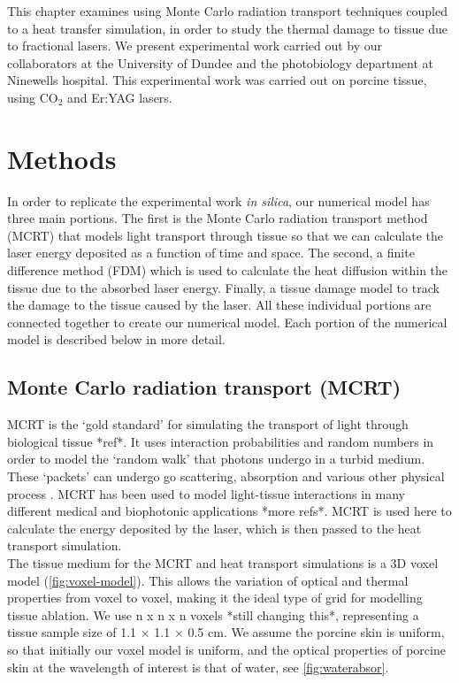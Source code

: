This chapter examines using Monte Carlo radiation transport techniques coupled to a heat transfer simulation, in order to study the thermal damage to tissue due to fractional lasers. We present experimental work carried out by our collaborators at the University of Dundee and the photobiology department at Ninewells hospital. This experimental work was carried out on porcine tissue, using CO$_2$ and Er:YAG lasers.

\section{Methods}

In order to replicate the experimental work \textit{in silica}, our numerical model has three main portions. The first is the Monte Carlo radiation transport method (MCRT) that models light transport through tissue so that we can calculate the laser energy deposited as a function of time and space. The second, a finite difference method (FDM) which is used to calculate the heat diffusion within the tissue due to the absorbed laser energy. Finally, a tissue damage model to track the damage to the tissue caused by the laser. All these individual portions are connected together to create our numerical model. Each portion of the numerical model is described below in more detail.

\subsection{Monte Carlo radiation transport (MCRT)}

MCRT is the `gold standard' for simulating the transport of light through biological tissue *ref*. It uses interaction probabilities and random numbers in order to model the `random walk' that photons undergo in a turbid medium. These `packets' can undergo go scattering, absorption and various other physical process \cite{yao1999monte,welch1997propagation}. MCRT has been used to model light-tissue interactions in many different medical and biophotonic applications \cite{campbell2015monte}*more refs*. MCRT is used here to calculate the energy deposited by the laser, which is then passed to the heat transport simulation.\\

The tissue medium for the MCRT and heat transport simulations is a 3D voxel model (\cref{fig:voxel-model}). This allows the variation of optical and thermal properties from voxel to voxel, making it the ideal type of grid for modelling tissue ablation. We use  n x n x n voxels *still changing this*, representing a tissue sample size of 1.1 $\times$ 1.1 $\times$ 0.5 cm. We assume the porcine skin is uniform, so that initially our voxel model is uniform, and the optical properties of porcine skin at the wavelength of interest is that of water, see \cref{fig:waterabsor}.\\


